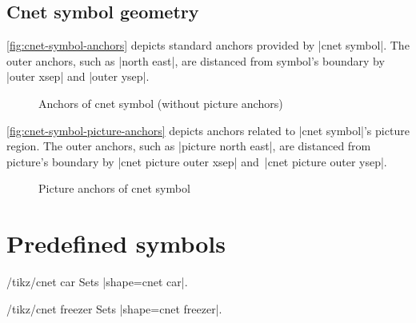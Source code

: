 \documentclass[a4paper]{ltxdoc}
\begin{document}
\subsection{Cnet symbol geometry}
\label{sec:cnet-symbol-geometry}

\autoref{fig:cnet-symbol-anchors} depicts standard anchors provided by
|cnet symbol|. The outer anchors, such as |north east|, are distanced from
symbol's boundary by |outer xsep| and |outer ysep|.
\begin{figure}[htbp]
  \begin{center}
  \end{center}
  \caption{Anchors of cnet symbol (without picture anchors)}
  \label{fig:cnet-symbol-anchors}
\end{figure}

\autoref{fig:cnet-symbol-picture-anchors} depicts anchors related to
|cnet symbol|'s picture region. The outer anchors, such as |picture north east|,
are distanced from picture's boundary by |cnet picture outer xsep|
and~|cnet picture outer ysep|.
\begin{figure}[htbp]
  \begin{center}
  \end{center}
  \caption{Picture anchors of cnet symbol}
  \label{fig:cnet-symbol-picture-anchors}
\end{figure}

\section{Predefined symbols}
\label{sec:predefined-symbols}

\begin{stylekey}{/tikz/cnet car}
Sets |shape={cnet car}|.
\begin{codeexample}[preamble={\usetikzlibrary{shapes.cnet.car}}]
\end{codeexample}
\end{stylekey}

\begin{stylekey}{/tikz/cnet freezer}
Sets |shape={cnet freezer}|.
\begin{codeexample}[preamble={\usetikzlibrary{shapes.cnet.freezer}}]
\end{codeexample}
\end{stylekey}
\end{document}
